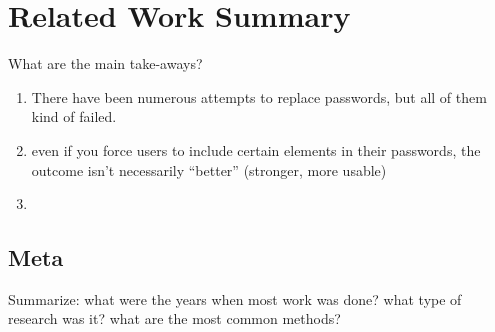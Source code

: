 
\chapter[Related Work Summary]{Related Work Summary}\label{chap:rw:summary}

What are the main take-aways?

\begin{enumerate}
	\item There have been numerous attempts to replace passwords, but all of them kind of failed.
	\item even if you force users to include certain elements in their passwords, the outcome isn't necessarily ``better'' (stronger, more usable)
	\item 
	
\end{enumerate}

\section{Meta}

Summarize: what were the years when most work was done? what type of research was it? what are the most common methods?






